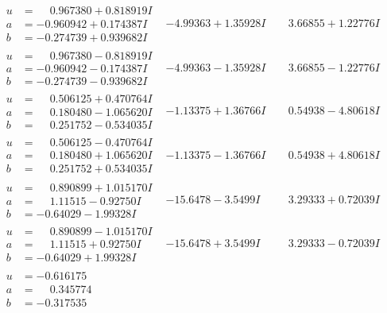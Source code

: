 \documentclass[1p]{elsarticle_modified}
\theoremstyle{definition}
\begin{document}
$$\begin{array}{c|c|c}
\begin{aligned}
u &= \phantom{-}0.967380 + 0.818919 I \\
a &= -0.960942 + 0.174387 I \\
b &= -0.274739 + 0.939682 I\end{aligned}
 & -4.99363 + 1.35928 I & \phantom{-}3.66855 + 1.22776 I \\ \hline\begin{aligned}
u &= \phantom{-}0.967380 - 0.818919 I \\
a &= -0.960942 - 0.174387 I \\
b &= -0.274739 - 0.939682 I\end{aligned}
 & -4.99363 - 1.35928 I & \phantom{-}3.66855 - 1.22776 I \\ \hline\begin{aligned}
u &= \phantom{-}0.506125 + 0.470764 I \\
a &= \phantom{-}0.180480 - 1.065620 I \\
b &= \phantom{-}0.251752 - 0.534035 I\end{aligned}
 & -1.13375 + 1.36766 I & \phantom{-}0.54938 - 4.80618 I \\ \hline\begin{aligned}
u &= \phantom{-}0.506125 - 0.470764 I \\
a &= \phantom{-}0.180480 + 1.065620 I \\
b &= \phantom{-}0.251752 + 0.534035 I\end{aligned}
 & -1.13375 - 1.36766 I & \phantom{-}0.54938 + 4.80618 I \\ \hline\begin{aligned}
u &= \phantom{-}0.890899 + 1.015170 I \\
a &= \phantom{-}1.11515 - 0.92750 I \\
b &= -0.64029 - 1.99328 I\end{aligned}
 & -15.6478 - 3.5499 I & \phantom{-}3.29333 + 0.72039 I \\ \hline\begin{aligned}
u &= \phantom{-}0.890899 - 1.015170 I \\
a &= \phantom{-}1.11515 + 0.92750 I \\
b &= -0.64029 + 1.99328 I\end{aligned}
 & -15.6478 + 3.5499 I & \phantom{-}3.29333 - 0.72039 I \\ \hline\begin{aligned}
u &= -0.616175\phantom{ +0.000000I} \\
a &= \phantom{-}0.345774\phantom{ +0.000000I} \\
b &= -0.317535\phantom{ +0.000000I}\end{aligned}

\end{array}$$
\end{document}
